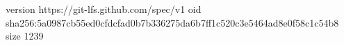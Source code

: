 version https://git-lfs.github.com/spec/v1
oid sha256:5a0987cb55ed0cfdcfad0b7b336275da6b7ff1c520c3e5464ad8e0f58c1c54b8
size 1239
